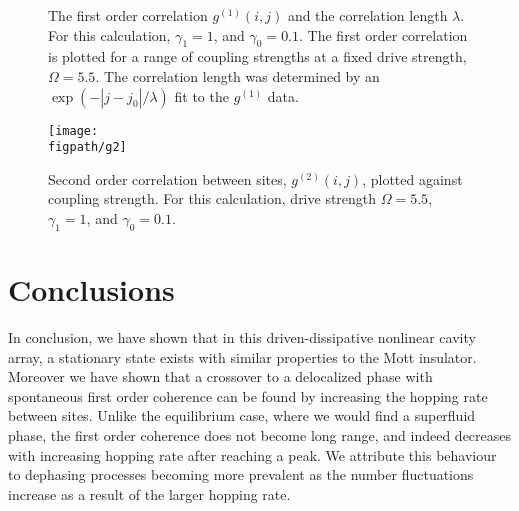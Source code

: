 \begin{figure}[ht]
	 \hfill
	\caption{\label{fig:dnlca5-2} The first order correlation \(g^{(1)}(i,j)\) and the correlation length $\lambda$. For this calculation, \(\gamma_{1} = 1\), and \(\gamma_{0} = 0.1\). The first order correlation is plotted for a range of coupling strengths at a fixed drive strength, \(\Omega = 5.5\). The correlation length was determined by an \(\exp(- |j-j_{0}|/\lambda)\) fit to the \(g^{(1)}\) data.}
\end{figure}
%
\begin{figure}[ht]
	\centering
	\texttt{[image: \\figpath/g2]}
	\caption{\label{fig:dnlca5-3} Second order correlation between sites, \(g^{(2)}(i,j)\), plotted against coupling strength. For this calculation, drive strength \(\Omega = 5.5\), \(\gamma_{1} = 1\), and \(\gamma_{0} = 0.1\).}
\end{figure}

\section{Conclusions}

In conclusion, we have shown that in this driven-dissipative nonlinear cavity array, a stationary state exists with similar properties to the Mott insulator. Moreover we have shown that a crossover to a delocalized phase with spontaneous first order coherence can be found by increasing the hopping rate between sites. Unlike the equilibrium case, where we would find a superfluid phase, the first order coherence does not become long range, and indeed decreases with increasing hopping rate after reaching a peak. We attribute this behaviour to dephasing processes becoming more prevalent as the number fluctuations increase as a result of the larger hopping rate.
